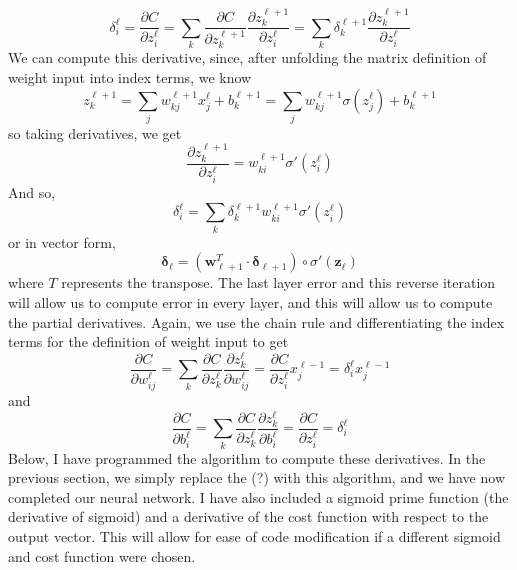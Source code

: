 \documentclass[10pt]{article}
\begin{document}
\[
\delta^{\ell}_i = \frac{\partial C}{\partial z^{\ell}_i} = \sum_{k} \frac{\partial C}{\partial z^{\ell+1}_k} \frac{\partial z^{\ell+1}_k}{\partial z^{\ell}_i}
=
\sum_{k} \delta^{\ell +1}_k \frac{\partial z^{\ell+1}_k}{\partial z^{\ell}_i}
\]
We can compute this derivative, since, after unfolding the matrix definition of weight input into index terms, we know
\[
z^{\ell+1}_k = \sum_j w^{\ell+1}_{kj}x^{\ell}_j + b^{\ell +1 }_k = \sum_j w^{\ell+1}_{kj}\sigma\left(z^{\ell}_j\right) + b^{\ell +1 }_k
\]
so taking derivatives, we get
\[
\frac{\partial z^{\ell+1}_k}{\partial z^{\ell}_i} = w^{\ell+1}_{ki}\sigma'\left(z^{\ell}_i\right)
\]
And so,
\[
\delta^{\ell}_i 
=
\sum_{k} \delta^{\ell +1}_k w^{\ell+1}_{ki}\sigma'\left(z^{\ell}_i\right)
\]
or in vector form,
\[
\boldsymbol{\delta}_{\ell} = \left( \mathbf{w}^{T}_{\ell+1} \cdot \boldsymbol{\delta}_{\ell+1} \right) \circ \sigma'\left(\mathbf{z_{\ell}}\right)
\]
where $T$ represents the transpose. The last layer error and this reverse iteration will allow us to compute error in every layer, and this will allow us to compute the partial derivatives. Again, we use the chain rule and differentiating the index terms for the definition of weight input to get
\[
\frac{\partial C}{\partial w^{\ell}_{ij}} = \sum_{k} \frac{\partial C}{\partial z^{\ell}_k} \frac{\partial z^{\ell}_k}{\partial w^{\ell}_{ij}}
= \frac{\partial C}{\partial z^{\ell}_i} x^{\ell-1}_j
= \delta^{\ell}_{i} x^{\ell-1}_j
\]
and
\[
\frac{\partial C}{\partial b^{\ell}_{i}} = \sum_{k} \frac{\partial C}{\partial z^{\ell}_k} \frac{\partial z^{\ell}_k}{\partial b^{\ell}_{i}}
= \frac{\partial C}{\partial z^{\ell}_i}
= \delta^{\ell}_{i}
\]
Below, I have programmed the algorithm to compute these derivatives. In the previous section, we simply replace the (?) with this algorithm, and we have now completed our neural network. I have also included a sigmoid prime function (the derivative of sigmoid) and a derivative of the cost function with respect to the output vector. This will allow for ease of code modification if a different sigmoid and cost function were chosen.
\end{document}
